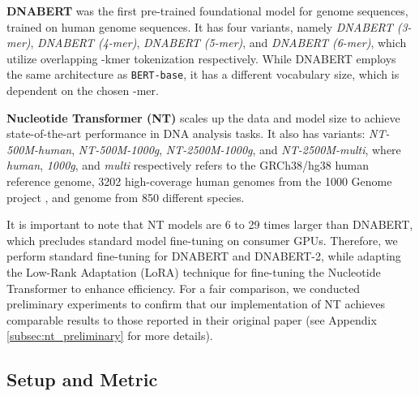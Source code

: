 \documentclass{article}
\begin{document}
\textbf{DNABERT} was the first pre-trained foundational model for genome sequences, trained on human genome sequences. It has four variants, namely \textit{DNABERT (3-mer)}, \textit{DNABERT (4-mer)}, \textit{DNABERT (5-mer)}, and \textit{DNABERT (6-mer)}, which utilize overlapping -kmer tokenization respectively. While DNABERT employs the same architecture as \texttt{BERT-base}, it has a different vocabulary size, which is dependent on the chosen -mer.

\textbf{Nucleotide Transformer (NT)} scales up the data and model size to achieve state-of-the-art performance in  DNA analysis tasks. It also has  variants: \textit{NT-500M-human}, \textit{NT-500M-1000g}, \textit{NT-2500M-1000g}, and \textit{NT-2500M-multi}, where \textit{human}, \textit{1000g}, and \textit{multi} respectively refers to the GRCh38/hg38 human reference genome, 3202 high-coverage human genomes from the 1000 Genome project \citep{1000g}, and genome from 850 different species. 

It is important to note that NT models are 6 to 29 times larger than DNABERT, which precludes standard model fine-tuning on consumer GPUs. Therefore, we perform standard fine-tuning for DNABERT and DNABERT-2, while adapting the Low-Rank Adaptation (LoRA) technique for fine-tuning the Nucleotide Transformer to enhance efficiency. For a fair comparison, we conducted preliminary experiments to confirm that our implementation of NT achieves comparable results to those reported in their original paper \citep{nt} (see Appendix \ref{subsec:nt_preliminary} for more details).

\subsection{Setup and Metric}
\label{subsec:experiments_setup}
\end{document}

